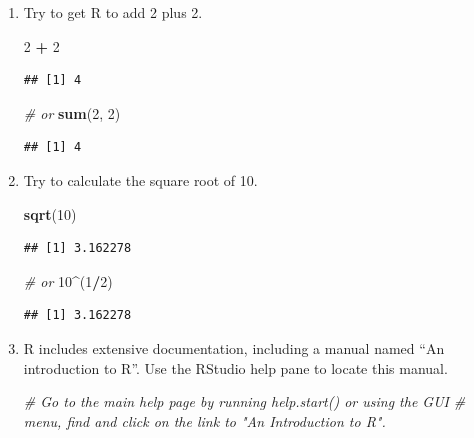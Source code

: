 \documentclass[
]{book}
\newenvironment{Shaded}{\begin{snugshade}}{\end{snugshade}}
\newcommand{\CommentTok}[1]{\textcolor[rgb]{0.56,0.35,0.01}{\textit{#1}}}
\newcommand{\DecValTok}[1]{\textcolor[rgb]{0.00,0.00,0.81}{#1}}
\newcommand{\KeywordTok}[1]{\textcolor[rgb]{0.13,0.29,0.53}{\textbf{#1}}}
\newcommand{\NormalTok}[1]{#1}
\newcommand{\OperatorTok}[1]{\textcolor[rgb]{0.81,0.36,0.00}{\textbf{#1}}}
\newcommand{\StringTok}[1]{\textcolor[rgb]{0.31,0.60,0.02}{#1}}
\begin{document}
\begin{alert}

\begin{enumerate}
\def\labelenumi{\arabic{enumi}.}
\item
  Try to get R to add 2 plus 2.

\begin{Shaded}
\begin{Highlighting}[]
\DecValTok{2} \OperatorTok{+}\StringTok{ }\DecValTok{2}
\end{Highlighting}
\end{Shaded}

\begin{verbatim}
## [1] 4
\end{verbatim}

\begin{Shaded}
\begin{Highlighting}[]
\CommentTok{\# or}
\KeywordTok{sum}\NormalTok{(}\DecValTok{2}\NormalTok{, }\DecValTok{2}\NormalTok{)}
\end{Highlighting}
\end{Shaded}

\begin{verbatim}
## [1] 4
\end{verbatim}
\item
  Try to calculate the square root of 10.

\begin{Shaded}
\begin{Highlighting}[]
\KeywordTok{sqrt}\NormalTok{(}\DecValTok{10}\NormalTok{)}
\end{Highlighting}
\end{Shaded}

\begin{verbatim}
## [1] 3.162278
\end{verbatim}

\begin{Shaded}
\begin{Highlighting}[]
\CommentTok{\# or}
\DecValTok{10}\OperatorTok{\^{}}\NormalTok{(}\DecValTok{1}\OperatorTok{/}\DecValTok{2}\NormalTok{)}
\end{Highlighting}
\end{Shaded}

\begin{verbatim}
## [1] 3.162278
\end{verbatim}
\item
  R includes extensive documentation, including a manual named ``An introduction to R''. Use the RStudio help pane to locate this manual.

\begin{Shaded}
\begin{Highlighting}[]
\CommentTok{\# Go to the main help page by running \textquotesingle{}help.start() or using the GUI}
\CommentTok{\# menu, find and click on the link to "An Introduction to R".}
\end{Highlighting}
\end{Shaded}
\end{enumerate}

\end{alert}
\end{document}
